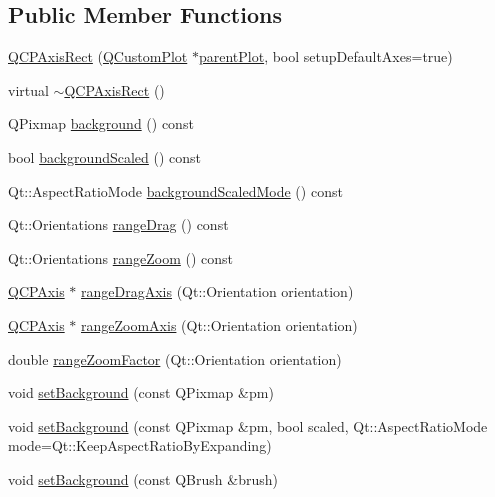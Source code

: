 \subsection*{Public Member Functions}
\begin{DoxyCompactItemize}
\item 
\hyperlink{classQCPAxisRect_a60b31dece805462c1b82eea2e69ba042}{Q\+C\+P\+Axis\+Rect} (\hyperlink{classQCustomPlot}{Q\+Custom\+Plot} $\ast$\hyperlink{classQCPLayerable_ab7e0e94461566093d36ffc0f5312b109}{parent\+Plot}, bool setup\+Default\+Axes=true)
\item 
virtual \hyperlink{classQCPAxisRect_a463c44b1856ddbf82eb3f7b582839cd0}{$\sim$\+Q\+C\+P\+Axis\+Rect} ()
\item 
Q\+Pixmap \hyperlink{classQCPAxisRect_a0daa1dadd2a62dbfa37b7f742edd0059}{background} () const 
\item 
bool \hyperlink{classQCPAxisRect_a67c18777b88fe9c81dee3dd2b5f50e5c}{background\+Scaled} () const 
\item 
Qt\+::\+Aspect\+Ratio\+Mode \hyperlink{classQCPAxisRect_a3d0f42d6be11a0b3d4576402a2b0032d}{background\+Scaled\+Mode} () const 
\item 
Qt\+::\+Orientations \hyperlink{classQCPAxisRect_af24b46954ce27a26b23770cdb8319080}{range\+Drag} () const 
\item 
Qt\+::\+Orientations \hyperlink{classQCPAxisRect_a3397fc60e5df29089090bc236e9f05f6}{range\+Zoom} () const 
\item 
\hyperlink{classQCPAxis}{Q\+C\+P\+Axis} $\ast$ \hyperlink{classQCPAxisRect_a6d7c22cfc54fac7a3d6ef80b133a8574}{range\+Drag\+Axis} (Qt\+::\+Orientation orientation)
\item 
\hyperlink{classQCPAxis}{Q\+C\+P\+Axis} $\ast$ \hyperlink{classQCPAxisRect_a679c63f2b8daccfe6ec5110dce3dd3b6}{range\+Zoom\+Axis} (Qt\+::\+Orientation orientation)
\item 
double \hyperlink{classQCPAxisRect_ae4e6c4d143aacc88d2d3c56f117c2fe1}{range\+Zoom\+Factor} (Qt\+::\+Orientation orientation)
\item 
void \hyperlink{classQCPAxisRect_af615ab5e52b8e0a9a0eff415b6559db5}{set\+Background} (const Q\+Pixmap \&pm)
\item 
void \hyperlink{classQCPAxisRect_ac48a2d5d9b7732e73b86605c69c5e4c1}{set\+Background} (const Q\+Pixmap \&pm, bool scaled, Qt\+::\+Aspect\+Ratio\+Mode mode=Qt\+::\+Keep\+Aspect\+Ratio\+By\+Expanding)
\item 
void \hyperlink{classQCPAxisRect_a22a22b8668735438dc06f9a55fe46b33}{set\+Background} (const Q\+Brush \&brush)

\end{DoxyCompactItemize}
